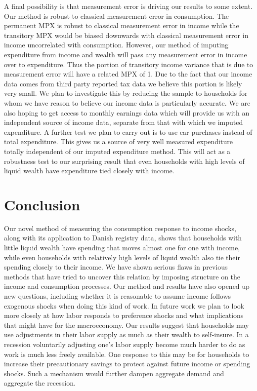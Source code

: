 \documentclass[titlepage]{\econtex}\newcommand{\texname}{IncomeUncertainty}
\begin{document}
A final possibility is that measurement error is driving our results to some extent. Our method is robust to classical measurement error in consumption. The permanent MPX is robust to classical measurement error in income while the transitory MPX would be biased downwards with classical measurement error in income uncorrelated with consumption. However, our method of imputing expenditure from income and wealth will pass any measurement error in income over to expenditure. Thus the portion of transitory income variance that is due to measurement error will have a related MPX of 1. Due to the fact that our income data comes from third party reported tax data we believe this portion is likely very small. We plan to investigate this by reducing the sample to households for whom we have reason to believe our income data is particularly accurate. We are also hoping to get access to monthly earnings data which will provide us with an independent source of income data, separate from that with which we imputed expenditure. A further test we plan to carry out is to use car purchases instead of total expenditure. This gives us a source of very well measured expenditure totally independent of our imputed expenditure method. This will act as a robustness test to our surprising result that even households with high levels of liquid wealth have expenditure tied closely with income.

\section{Conclusion}
Our novel method of measuring the consumption response to income shocks, along with its application to Danish registry data, shows that households with little liquid wealth have spending that moves almost one for one with income, while even households with relatively high levels of liquid wealth also tie their spending closely to their income. We have shown serious flaws in previous methods that have tried to uncover this relation by imposing structure on the income and consumption processes. Our method and results have also opened up new questions, including whether it is reasonable to assume income follows exogenous shocks when doing this kind of work. In future work we plan to look more closely at how labor responds to preference shocks and what implications that might have for the macroeconomy. Our results suggest that households may use adjustments in their labor supply as much as their wealth to self-insure. In a recession voluntarily adjusting one's labor supply become much harder to do as work is much less freely available. One response to this may be for households to increase their precautionary savings to protect against future income or spending shocks. Such a mechanism would further dampen aggregate demand and aggregate the recession.
\end{document}
